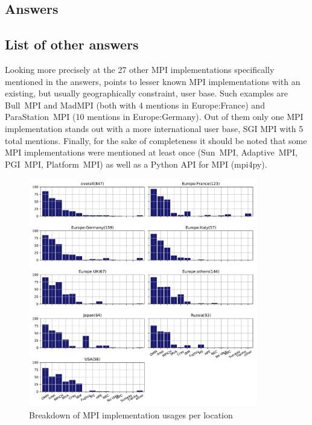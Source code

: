 
\subsection{Answers}


\subsection{List of other answers}

Looking more precisely at the 27 other MPI implementations specifically mentioned in the answers, points to lesser known MPI implementations with an existing, but usually geographically constraint, user base. Such examples are Bull~MPI and MadMPI (both with 4 mentions in Europe:France) and ParaStation~MPI (10 mentions in Europe:Germany). Out of them only one MPI implementation stands out with a more international user base, SGI MPI with 5 total mentions. Finally, for the sake of completeness it should be noted that some MPI implementations were mentioned at least once (Sun~MPI, Adaptive~MPI, PGI~MPI, Platform~MPI) as well as a Python API for MPI (mpi4py).

\begin{report}
\begin{itemize}

\end{itemize}
\end{report}

\begin{figure}[htb]
\begin{center}
\includegraphics[width=10cm]{../pdfs/Q12.pdf}
\caption{Breakdown of MPI implementation usages per location}
\label{fig:Q12}
\end{center}
\end{figure}
